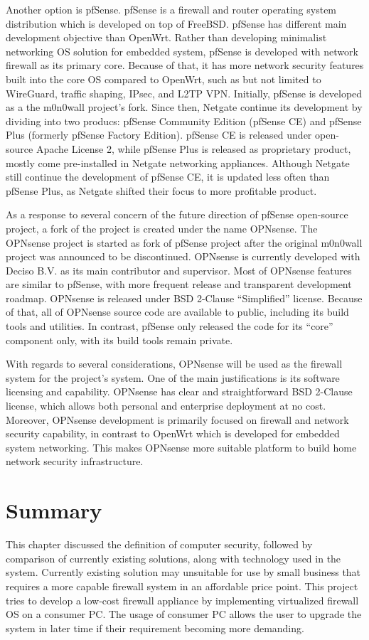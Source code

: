 \documentclass[../index.tex]{subfiles}
\begin{document}
Another option is pfSense. pfSense is a firewall and router operating system distribution which is
developed on top of FreeBSD. pfSense has different main development objective than OpenWrt. Rather
than developing minimalist networking OS solution for embedded system, pfSense is developed with
network firewall as its primary core. Because of that, it has more network security features built
into the core OS compared to OpenWrt, such as but not limited to WireGuard, traffic shaping, IPsec,
and L2TP VPN. Initially, pfSense is developed as a the m0n0wall project’s fork. Since then, Netgate
continue its development by dividing into two producs: pfSense Community Edition (pfSense CE) and
pfSense Plus (formerly pfSense Factory Edition). pfSense CE is released under open-source Apache
License 2, while pfSense Plus is released as proprietary product, mostly come pre-installed in
Netgate networking appliances. Although Netgate still continue the development of pfSense CE, it is
updated less often than pfSense Plus, as Netgate shifted their focus to more profitable product.

As a response to several concern of the future direction of pfSense open-source project, a fork of
the project is created under the name OPNsense. The OPNsense project is started as fork of pfSense
project after the original m0n0wall project was announced to be discontinued. OPNsense is currently
developed with Deciso B.V. as its main contributor and supervisor. Most of OPNsense features are
similar to pfSense, with more frequent release and transparent development roadmap. OPNsense is
released under BSD 2-Clause “Simplified” license. Because of that, all of OPNsense source code are
available to public, including its build tools and utilities. In contrast, pfSense only released the
code for its “core” component only, with its build tools remain private.

With regards to several considerations, OPNsense will be used as the firewall system for the
project’s system. One of the main justifications is its software licensing and capability. OPNsense
has clear and straightforward BSD 2-Clause license, which allows both personal and enterprise
deployment at no cost. Moreover, OPNsense development is primarily focused on firewall and network
security capability, in contrast to OpenWrt which is developed for embedded system networking. This
makes OPNsense more suitable platform to build home network security infrastructure.

\section{Summary}

This chapter discussed the definition of computer security, followed by comparison of currently
existing solutions, along with technology used in the system. Currently existing solution may
unsuitable for use by small business that requires a more capable firewall system in an affordable
price point. This project tries to develop a low-cost firewall appliance by implementing virtualized
firewall OS on a consumer PC. The usage of consumer PC allows the user to upgrade the system in
later time if their requirement becoming more demanding.
\end{document}
